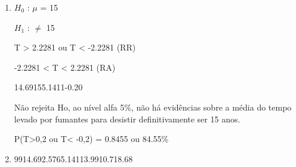 
\begin{question}
    
    \begin{enumerate}[label={\textbf{\alph*)}}]
        
        \item 
        
            $H_0$ : $\mu$ = 15 

            $H_1$ : $\neq$ 15 
        
            T > 2.2281 ou T < -2.2281 (RR)

            -2.2281 < T < 2.2281 (RA)

            \begin{formula7}
                {14.69}{15}{5.14}{11}{-0.20}
            \end{formula7}

            Não rejeita Ho, ao nível alfa 5\%, não há evidências sobre a média do tempo 
            levado por fumantes para desistir definitivamente ser 15 anos. 

            P(T>0,2 ou T< -0,2) = 0.8455 ou 84.55\%
        \item 
    
            \begin{formula2}
                {99}{14.69}{2.576}{5.14}{11}{3.99}{10.7}{18.68}
            \end{formula2}

    \end{enumerate}
\end{question}


